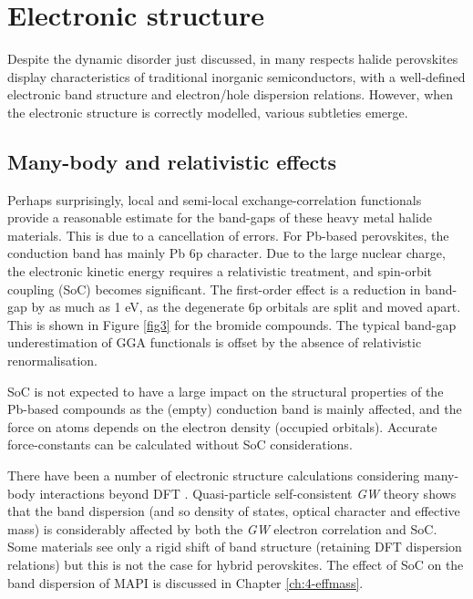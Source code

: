 \section{Electronic structure}

Despite the dynamic disorder just discussed, in many respects halide perovskites display characteristics of traditional inorganic semiconductors, with a well-defined electronic band structure and electron/hole dispersion relations.
However, when the electronic structure is correctly modelled, various subtleties emerge. 

\subsection{Many-body and relativistic effects} \label{Mbre}

Perhaps surprisingly, local and semi-local exchange-correlation functionals 
provide a reasonable estimate for the band-gaps of these heavy metal halide materials.
This is due to a cancellation of errors. 
For Pb-based perovskites, the conduction band has mainly Pb 6p character. 
Due to the large nuclear charge, the electronic kinetic energy requires a relativistic
treatment, and spin-orbit coupling (SoC) becomes significant. 
The first-order effect is a reduction in band-gap by as much as 1 eV\autocite{Brivio2014a}, as the degenerate 6p orbitals are split and moved apart. 
This is shown in Figure \ref{fig3} for the bromide compounds.
The typical band-gap underestimation of GGA functionals is offset by the absence of relativistic renormalisation.

SoC is not expected to have a large impact on the structural properties of the Pb-based compounds as the (empty) conduction band is mainly affected, and the force on atoms depends on the electron density (occupied orbitals). 
Accurate force-constants can be calculated without SoC considerations.\autocite{PerezOsorio2015a}

There have been a number of electronic structure calculations considering many-body interactions beyond DFT . 
Quasi-particle self-consistent \textit{GW} theory shows that the band dispersion (and so density of states, optical character and effective mass) is considerably affected by both the \textit{GW} electron correlation and SoC.\autocite{Brivio2014a}
Some materials see only a rigid shift of band structure (retaining DFT dispersion relations)\autocite{VanSchilfgaarde2006,Butler2016} but this is not the case for hybrid perovskites.
The effect of SoC on the band dispersion of MAPI is discussed in Chapter \ref{ch:4-effmass}.

